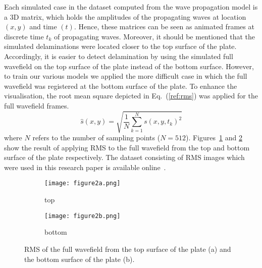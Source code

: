 Each simulated case in the dataset computed from the wave propagation model is a 3D matrix, which holds the amplitudes of the propagating waves at location \((x,y)\) and time \((t)\).
Hence, these matrices can be seen as animated frames at discrete time \(t_k\) of propagating waves.
Moreover, it should be mentioned that the simulated delaminations were located closer to the top surface of the plate.
Accordingly, it is easier to detect delamination by using the simulated full wavefield on the top surface of the plate instead of the bottom surface.
However, to train our various models we applied the more difficult case in which the full wavefield was registered at the bottom surface of the plate.
To enhance the visualisation, the root mean square depicted in Eq.~(\ref{ref:rms}) was applied for the full wavefield frames.
\begin{equation}
	\hat{s}(x,y) = \sqrt{\frac{1}{N}\sum_{k=1}^{N} s(x,y,t_k)^2}
	\label{ref:rms}
\end{equation}
where \(N\) refers to the number of sampling points (\(N=512\)).
Figures~\ref{fig:rmstop} and \ref{fig:rmsbottom} show the result of applying RMS to the full wavefield from the top and bottom surface of the plate respectively.
The dataset consisting of RMS images which were used in this research paper is available online~\cite{Kudela2020d}.
\begin{figure} [h!]
	\centering
	\begin{subfigure}[b]{0.47\textwidth}
		\centering
		\texttt{[image: figure2a.png]}
		\caption{top}
		\label{fig:rmstop}
	\end{subfigure}
	\hfill
	\begin{subfigure}[b]{0.47\textwidth}
		\centering
		\texttt{[image: figure2b.png]}
		\caption{bottom}
		\label{fig:rmsbottom}
	\end{subfigure}
	\caption{RMS of the full wavefield from the top surface of the plate (a) and the bottom surface of the plate (b).}
\label{fig:rms}
\end{figure} 
